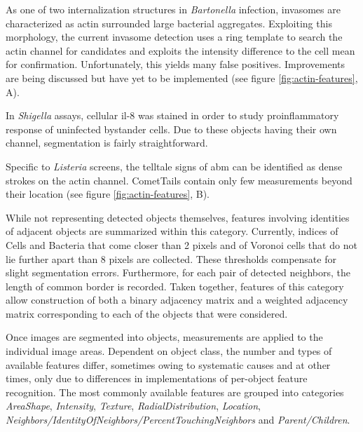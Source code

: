 \begin{description}[leftmargin=0.5cm]
\item[Invasomes:] As one of two internalization structures in \textit{Bartonella} infection, invasomes are characterized as actin surrounded large bacterial aggregates. Exploiting this morphology, the current invasome detection uses a ring template to search the actin channel for candidates and exploits the intensity difference to the cell mean for confirmation. Unfortunately, this yields many false positives. Improvements are being discussed but have yet to be implemented (see figure \ref{fig:actin-features}, A).
\item[IL8:] In \textit{Shigella} assays, cellular \gls{il-8} was stained in order to study proinflammatory response of uninfected bystander cells. Due to these objects having their own channel, segmentation is fairly straightforward.
\item[CometTails:] Specific to \textit{Listeria} screens, the telltale signs of \gls{abm} can be identified as dense strokes on the actin channel. CometTails contain only few measurements beyond their location (see figure \ref{fig:actin-features}, B).
\item[Neighbors:] While not representing detected objects themselves, features involving identities of adjacent objects are summarized within this category. Currently, indices of Cells and Bacteria that come closer than 2 pixels and of Voronoi cells that do not lie further apart than 8 pixels are collected. These thresholds compensate for slight segmentation errors. Furthermore, for each pair of detected neighbors, the length of common border is recorded. Taken together, features of this category allow construction of both a binary adjacency matrix and a weighted adjacency matrix corresponding to each of the objects that were considered.
\end{description}

Once images are segmented into objects, measurements are applied to the individual image areas. Dependent on object class, the number and types of available features differ, sometimes owing to systematic causes and at other times, only due to differences in implementations of per-object feature recognition. The most commonly available features are grouped into categories \textit{AreaShape}, \textit{Intensity}, \textit{Texture}, \textit{RadialDistribution}, \textit{Location}, \textit{Neighbors\slash IdentityOfNeighbors\slash Per\-centTouchingNeighbors} and \textit{Parent\slash Children}.


